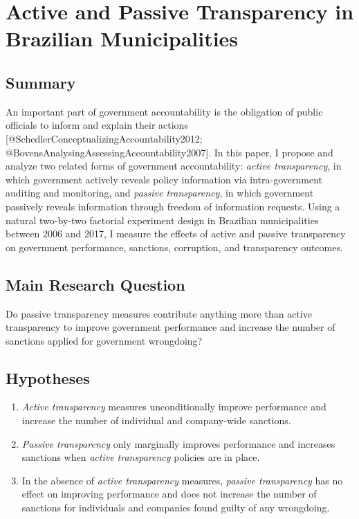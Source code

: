 \documentclass[]{article}
\title{}
\author{}
\date{}
\begin{document}
\hypertarget{title3}{%
\section{Active and Passive Transparency in Brazilian
Municipalities}\label{title3}}

\hypertarget{summary}{%
\subsection{Summary}\label{summary}}

An important part of government accountability is the obligation of
public officials to inform and explain their actions
{[}@SchedlerConceptualizingAccountability2012;
@BovensAnalysingAssessingAccountability2007{]}. In this paper, I propose
and analyze two related forms of government accountability: \emph{active
transparency}, in which government actively reveals policy information
via intra-government auditing and monitoring, and \emph{passive
transparency}, in which government passively reveals information through
freedom of information requests. Using a natural two-by-two factorial
experiment design in Brazilian municipalities between 2006 and 2017, I
measure the effects of active and passive transparency on government
performance, sanctions, corruption, and transparency outcomes.

\hypertarget{main-research-question}{%
\subsection{Main Research Question}\label{main-research-question}}

Do passive transparency measures contribute anything more than active
transparency to improve government performance and increase the number
of sanctions applied for government wrongdoing?

\hypertarget{hypotheses}{%
\subsection{Hypotheses}\label{hypotheses}}

\begin{enumerate}
\item
  \emph{Active transparency} measures unconditionally improve
  performance and increase the number of individual and company-wide
  sanctions.
\item
  \emph{Passive transparency} only marginally improves performance and
  increases sanctions when \emph{active transparency} policies are in
  place.
\item
  In the absence of \emph{active transparency} measures, \emph{passive
  transparency} has no effect on improving performance and does not
  increase the number of sanctions for individuals and companies found
  guilty of any wrongdoing.
\end{enumerate}
\end{document}
